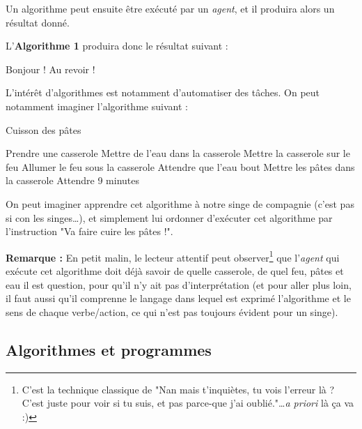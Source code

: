 \documentclass[../../main.tex]{subfiles}
\begin{document}
Un algorithme peut ensuite être exécuté par un \textit{agent}, et il produira alors un résultat donné.


L'\textbf{Algorithme 1} produira donc le résultat suivant :

\begin{minipage}{1.\textwidth} \selectfont
	Bonjour !\newline
	Au revoir !
\end{minipage}

L'intérêt d'algorithmes est notamment d'automatiser des tâches. On peut notamment imaginer l'algorithme suivant :
\newline
\begin{algorithm}
\caption{Cuisson des pâtes}\label{alg:letters}
Prendre une casserole\;
Mettre de l'eau dans la casserole\;
Mettre la casserole sur le feu\;
Allumer le feu sous la casserole\;
 {
	Attendre que l'eau bout\;
}
Mettre les pâtes dans la casserole\;
Attendre 9 minutes\;
\end{algorithm}

On peut imaginer apprendre cet algorithme à notre singe de compagnie (c'est pas si con les singes\dots), et simplement lui ordonner d'exécuter cet algorithme par l'instruction "Va faire cuire les pâtes !".

\textbf{Remarque :} En petit malin, le lecteur attentif peut observer\footnote{C'est la technique classique de "Nan mais t'inquiètes, tu vois l'erreur là ? C'est juste pour voir si tu suis, et pas parce-que j'ai oublié."\dots \textit{a priori} là ça va :)} que l'\textit{agent} qui exécute cet algorithme doit déjà savoir de quelle casserole, de quel feu, pâtes et eau il est question, pour qu'il n'y ait pas d'interprétation (et pour aller plus loin, il faut aussi qu'il comprenne le langage dans lequel est exprimé l'algorithme et le sens de chaque verbe/action, ce qui n'est pas toujours évident pour un singe).
\subsection{Algorithmes et programmes}
\end{document}
